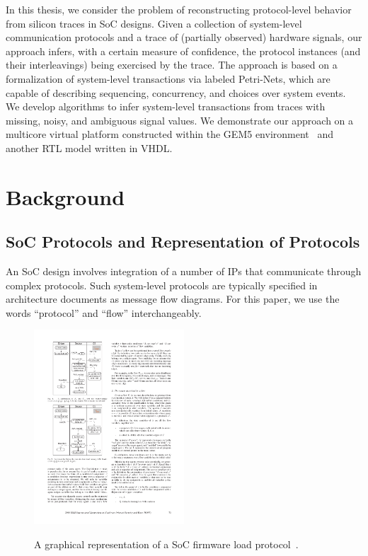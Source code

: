 \documentclass[12pt,frontmatter,copyright,thesis]{usfmanus}
\begin{document}
In this thesis, we consider the problem of reconstructing
protocol-level behavior from silicon traces in SoC designs.
Given a collection of system-level communication protocols
and a trace of (partially observed) hardware signals, our
approach infers, with a certain measure of confidence, the
protocol instances (and their interleavings) being exercised
by the trace.  The approach is based on a formalization of
system-level transactions via labeled Petri-Nets, which are
capable of describing sequencing, concurrency, and choices
over system events.  We develop algorithms to infer
system-level transactions from traces with missing, noisy,
and ambiguous signal values.  We demonstrate our approach on
a multicore virtual platform constructed within the GEM5
environment~\cite{Binkert2011} and another RTL model written in VHDL.



\chapter{Background}
 \section{SoC Protocols and Representation of Protocols}
 
 An SoC design involves integration of a number of IPs that
communicate through complex protocols.  Such system-level
protocols are typically specified in architecture documents
as message flow diagrams.  For this paper, we use the words
``protocol'' and ``flow'' interchangeably.

\begin{figure}[h]
\centering
\includegraphics[width=0.5\textwidth]{figures/bpmn-flow-ex}
\label{flowa}
\caption{A graphical representation of a SoC firmware load protocol~\cite{Krstic14HOST}.}
\end{figure}
\end{document}
